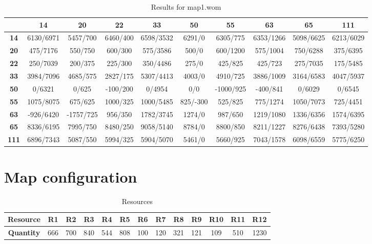 \documentclass[a4paper,10pt]{article}
\begin{document}
\begin{table}[htb]
\caption{Results for map1.wom}
\centering
\begin{tabular}{|c||c|c|c|c|c|c|c|c|c|}
\hline
 & \textbf{14} & \textbf{20} & \textbf{22} & \textbf{33} & \textbf{50} & \textbf{55} & \textbf{63} & \textbf{65} & \textbf{111} \\
\hline
\hline
\textbf{14} & 6130/6971 & 5457/700 & 6460/400 & 6598/3532 & 6291/0 & 6305/775 & 6353/1266 & 5098/6625 & 6213/6029 \\
\hline
\textbf{20} & 475/7176 & 550/750 & 600/300 & 575/3586 & 500/0 & 600/1200 & 575/1004 & 750/6288 & 375/6395 \\
\hline
\textbf{22} & 250/7039 & 200/375 & 225/300 & 350/4486 & 275/0 & 425/825 & 425/723 & 275/7035 & 175/5485 \\
\hline
\textbf{33} & 3984/7096 & 4685/575 & 2827/175 & 5307/4413 & 4003/0 & 4910/725 & 3886/1009 & 3164/6583 & 4047/5937 \\
\hline
\textbf{50} & 0/6321 & 0/625 & -100/200 & 0/4954 & 0/0 & -1000/925 & -400/841 & 0/6029 & 0/6545 \\
\hline
\textbf{55} & 1075/8075 & 675/625 & 1000/325 & 1000/5485 & 825/-300 & 525/825 & 775/1274 & 1050/7073 & 725/4451 \\
\hline
\textbf{63} & -926/6420 & -1757/725 & 956/350 & 1782/3745 & 1274/0 & 987/650 & 1219/1080 & 1336/6356 & 1574/6395 \\
\hline
\textbf{65} & 8336/6195 & 7995/750 & 8480/250 & 9058/5140 & 8784/0 & 8800/850 & 8211/1227 & 8276/6438 & 7393/5280 \\
\hline
\textbf{111} & 6896/7343 & 5087/550 & 5994/325 & 5904/5070 & 5461/0 & 5660/925 & 7043/1578 & 6098/6559 & 5775/6250 \\
\hline
\end{tabular}
\label{table:map1.wom}
\end{table}

\section{Map configuration}
\label{sec:mapconfig}

\begin{table}[htb]
\caption{Resources}
\centering
\begin{tabular}{|c||c|c|c|c|c|c|c|c|c|c|c|c|}
\hline
\textbf{Resource} & R1 & R2 & R3 & R4 & R5 & R6 & R7 & R8 & R9 & R10 & R11 & R12\\
\hline
\textbf{Quantity} & 666 & 700 & 840 & 544 & 808 & 100 & 120 & 321 & 121 & 109 & 510 & 1230\\
\hline
\end{tabular}
\label{table:res_map1.wom}
\end{table}
\end{document}
